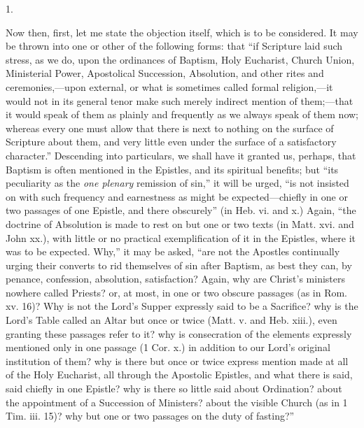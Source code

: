 1.

Now then, first, let me state the objection itself, which is to be
considered. It may be thrown into one or other of the following forms:
that ``if Scripture laid such stress, as we do, upon the
ordinances of Baptism, Holy Eucharist, Church Union, Ministerial
Power, Apostolical Succession, Absolution, and other rites and
ceremonies,—upon external, or what is sometimes called formal
religion,—it would not in its general tenor make such merely
indirect mention of them;—that it would speak of them as plainly and
frequently as we always speak of them now; whereas every one must
allow that there is next to nothing on the surface of Scripture about
them, and very little even under the surface of a satisfactory
character.'' Descending into particulars, we shall have it granted
us, perhaps, that Baptism is often mentioned in the Epistles, and its
spiritual benefits; but ``its peculiarity as the \emph{one plenary}
remission of sin,'' it will be urged, ``is not insisted on
with such frequency and earnestness as might be expected—chiefly in
one or two passages of one Epistle, and there obscurely'' (in Heb.
vi. and x.) Again, ``the doctrine of Absolution is made to rest on
but one or two texts (in Matt. xvi. and John xx.), with little or no
practical exemplification of it in the Epistles, where it was to be
expected. Why,'' it may be asked, ``are not the Apostles
continually urging their converts to rid themselves of sin after
Baptism, as best they can, by penance, confession, absolution,
satisfaction? Again, why are Christ's ministers nowhere called
Priests? or, at most, in one or two obscure passages (as in Rom. xv.
16)? Why is not the Lord's Supper expressly said to be a Sacrifice?
why is the Lord's Table called an Altar but once or twice (Matt. v.
and Heb. xiii.), even granting these passages refer to it? why is
consecration of the elements expressly mentioned only in one passage
(1 Cor. x.) in addition to our Lord's original institution of them?
why is there but once or twice express mention made at all of the Holy
Eucharist, all through the Apostolic Epistles, and what there is said,
said chiefly in one Epistle? why is there so little said about
Ordination? about the appointment of a Succession of Ministers? about
the visible Church (as in 1 Tim. iii. 15)? why but one or two passages
on the duty of fasting?''

